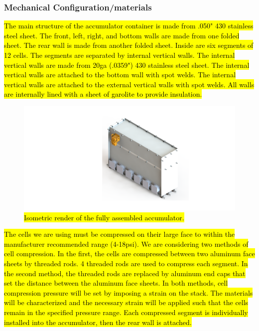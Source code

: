 \documentclass{article}
\begin{document}
	

\subsubsection{Mechanical Configuration/materials}\label{accumulator_mechanical_configuration}


\hl{The main structure of the accumulator container is made from .050" 430 stainless steel sheet. The front, left, right, and bottom walls are made from one folded sheet. The rear wall is made from another folded sheet. Inside are six segments of 12 cells. The segments are separated by internal vertical walls. The internal vertical walls are made from 20ga (.0359") 430 stainless steel sheet. The internal vertical walls are attached to the bottom wall with spot welds. The internal vertical walls are attached to the external vertical walls with spot welds. All walls are internally lined with a sheet of garolite to provide insulation.}

\begin{figure}[H]
\centering
\includegraphics[width=1\textwidth]{accumulator}
\caption{\hl{Isometric render of the fully assembled accumulator. }}
\label{fig:accumulator}
\end{figure}

\hl{The cells we are using must be compressed on their large face to within the manufacturer recommended range (4-18psi). We are considering two methods of cell compression. In the first, the cells are compressed between  two aluminum face sheets by threaded rods. 4 threaded rods are used to compress each segment. In the second method, the threaded rods are replaced by aluminum end caps that set the distance between the aluminum face sheets. In both methods, cell compression pressure will be set by imposing a strain on the stack. The materials will be characterized and the necessary strain will be applied such that the cells remain in the specified pressure range. Each compressed segment is individually installed into the accumulator, then the rear wall is attached.}
\end{document}
